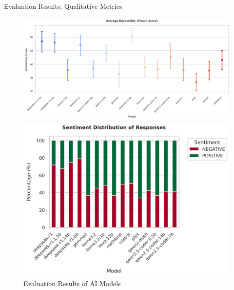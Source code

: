 \documentclass{beamer}
\begin{document}
\begin{frame}{Evaluation Results: Qualitative Metrics}
\begin{figure}
    \begin{minipage}{0.45\textwidth}
      \centering
      \includegraphics[width=\textwidth]{readability.png}
    \end{minipage}
    \hfill
    \begin{minipage}{0.45\textwidth}
      \centering
      \includegraphics[width=\textwidth]{sentiment.png}
    \end{minipage}
    
    \caption{Evaluation Results of AI Models}
    \label{fig:evaluation-results}
  \end{figure}
\end{frame}
\end{document}
